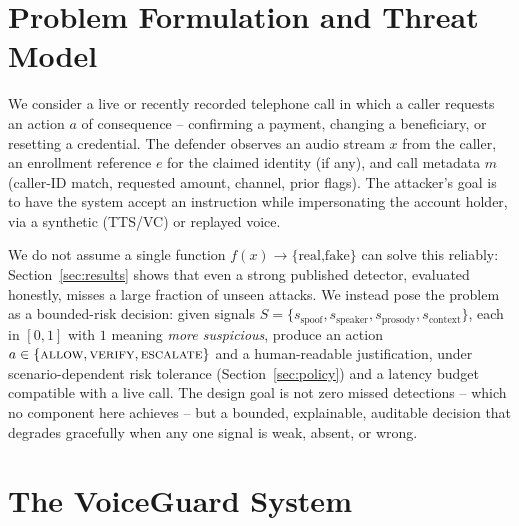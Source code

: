\documentclass[conference]{IEEEtran}
\begin{document}
\section{Problem Formulation and Threat Model}
\label{sec:problem}
We consider a live or recently recorded telephone call in which a
caller requests an action $a$ of consequence -- confirming a payment,
changing a beneficiary, or resetting a credential. The defender
observes an audio stream $x$ from the caller, an enrollment reference
$e$ for the claimed identity (if any), and call metadata $m$ (caller-ID
match, requested amount, channel, prior flags). The attacker's goal is
to have the system accept an instruction while impersonating the
account holder, via a synthetic (TTS/VC) or replayed voice.

We do not assume a single function $f(x)\!\to\!\{\text{real,fake}\}$ can
solve this reliably: Section~\ref{sec:results} shows that even a strong
published detector, evaluated honestly, misses a large fraction of
unseen attacks. We instead pose the problem as a bounded-risk decision:
given signals $S = \{s_{\text{spoof}}, s_{\text{speaker}},
s_{\text{prosody}}, s_{\text{context}}\}$, each in $[0,1]$ with $1$
meaning \emph{more suspicious}, produce an action
$a \in \{\textsc{allow}, \textsc{verify}, \textsc{escalate}\}$ and a
human-readable justification, under scenario-dependent risk tolerance
(Section~\ref{sec:policy}) and a latency budget compatible with a live
call. The design goal is not zero missed detections -- which no
component here achieves -- but a bounded, explainable, auditable
decision that degrades gracefully when any one signal is weak, absent,
or wrong.

\section{The VoiceGuard System}
\label{sec:system}
\end{document}
